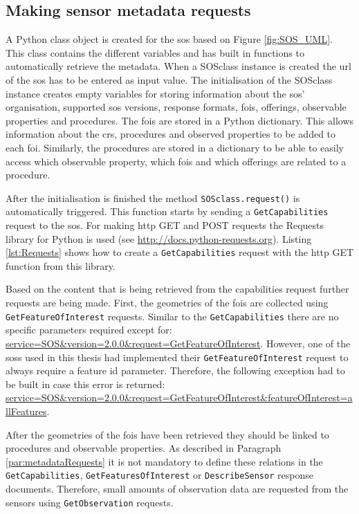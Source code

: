 \subsection{Making sensor metadata requests}
A Python class object is created for the \ac{sos} based on Figure \ref{fig:SOS_UML}. This class contains the different variables and has built in functions to automatically retrieve the metadata. When a SOSclass instance is created the \ac{url} of the \ac{sos} has to be entered as input value. The initialisation of the SOSclass instance creates empty variables for storing information about the \ac{sos}' organisation, supported \ac{sos} versions, response formats, \acp{foi}, offerings, observable properties and procedures. The \acp{foi} are stored in a Python dictionary. This allows information about the \ac{crs}, procedures and observed properties to be added to each \ac{foi}. Similarly, the procedures are stored in a dictionary to be able to easily access which observable property, which \acp{foi} and which offerings are related to a procedure.

After the initialisation is finished the method \texttt{SOSclass.request()} is automatically triggered. This function starts by sending a \texttt{GetCapabilities} request to the \ac{sos}. For making \ac{http} GET and POST requests the Requests library for Python is used (see \url{http://docs.python-requests.org}). Listing \ref{lst:Requests} shows how to create a \texttt{GetCapabilities} request with the \ac{http} GET function from this library.

\begin{sloppypar}
	Based on the content that is being retrieved from the capabilities request further requests are being made. First, the geometries of the \acp{foi} are collected using \texttt{GetFeatureOfInterest} requests. Similar to the \texttt{GetCapabilities} there are no specific parameters required except for: \url{service=SOS&version=2.0.0&request=GetFeatureOfInterest}. However, one of the \aclp{sos} used in this thesis had implemented their \texttt{GetFeatureOfInterest} request to always require a feature id parameter. Therefore, the following exception had to be built in case this error is returned: \url{service=SOS&version=2.0.0&request=GetFeatureOfInterest&featureOfInterest=allFeatures}.
\end{sloppypar}

\begin{sloppypar}
After the geometries of the \acp{foi} have been retrieved they should be linked to procedures and observable properties. As described in Paragraph \ref{par:metadataRequests} it is not mandatory to define these relations in the \texttt{GetCapabilities}, \texttt{GetFeaturesOfInterest} or \texttt{DescribeSensor} response documents. Therefore, small amounts of observation data are requested from the sensors using \texttt{GetObservation} requests.  
\end{sloppypar}

